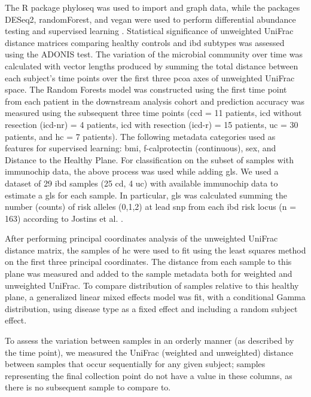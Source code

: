 The R package phyloseq was used to import and graph data, while the packages DESeq2, randomForest, and vegan were used to perform differential abundance testing and supervised learning \cite{Ihaka1996,Liaw2002,Love2014,McMurdie2013,Oksanen2016}. Statistical significance of unweighted UniFrac distance matrices comparing healthy controls and \gls{ibd} subtypes was assessed using the ADONIS test. The variation of the microbial community over time was calculated with vector lengths produced by summing the total distance between each subject's time points over the first three \gls{pcoa} axes of unweighted UniFrac space. The Random Forests model was constructed using the first time point from each patient in the downstream analysis cohort and prediction accuracy was measured using the subsequent three time points  (\gls{ccd} = 11 patients, \gls{icd} without resection (\gls{icd}-nr) = 4 patients, \gls{icd} with resection (\gls{icd}-r) = 15 patients, \gls{uc} = 30 patients, and \gls{hc} = 7 patients). The following metadata categories used as features for supervised learning: \gls{bmi}, f-calprotectin (continuous), sex, and Distance to the Healthy Plane. For classification on the subset of samples with immunochip data, the above process was used while adding \gls{gls}. We used a dataset of 29 \gls{ibd} samples (25 \gls{cd}, 4 \gls{uc}) with available immunochip data to estimate a \gls{gls} for each sample. In particular, \gls{gls} was calculated summing the number (counts) of risk alleles (0,1,2) at lead \gls{snp} from each \gls{ibd} risk locus (n = 163) according to Jostins et al. \cite{Jostins2012}.

After performing principal coordinates analysis of the unweighted UniFrac distance matrix, the samples of \gls{hc} were used to fit using the least squares method on the first three principal coordinates. The distance from each sample to this plane was measured and added to the sample metadata both for weighted and unweighted UniFrac. To compare distribution of samples relative to this healthy plane, a generalized linear mixed effects model was fit, with a conditional Gamma distribution, using disease type as a fixed effect and including a random subject effect.

To assess the variation between samples in an orderly manner (as described by the time point), we measured the UniFrac (weighted and unweighted) distance between samples that occur sequentially for any given subject; samples representing the final collection point do not have a value in these columns, as there is no subsequent sample to compare to.

